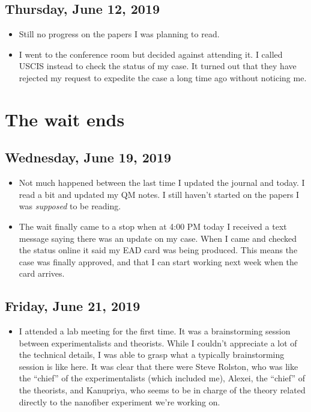 \documentclass{report}
\theoremstyle{definition}
\begin{document}
\section{Thursday, June 12, 2019}
\begin{itemize}
	\item Still no progress on the papers I was planning to read.
	
	\item I went to the conference room but decided against attending it. I called USCIS instead to check the status of my case. It turned out that they have rejected my request to expedite the case a long time ago without noticing me.
\end{itemize}

\chapter{The wait ends}
\section{Wednesday, June 19, 2019}
\begin{itemize}
	\item Not much happened between the last time I updated the journal and today. I read a bit and updated my QM notes. I still haven't started on the papers I was \textit{supposed} to be reading.
	
	\item The wait finally came to a stop when at 4:00 PM today I received a text message saying there was an update on my case. When I came and checked the status online it said my EAD card was being produced. This means the case was finally approved, and that I can start working next week when the card arrives.
	
\end{itemize}

\section{Friday, June 21, 2019}
\begin{itemize}
	\item I attended a lab meeting for the first time. It was a brainstorming session between experimentalists and theorists. While I couldn't appreciate a lot of the technical details, I was able to grasp what a typically brainstorming session is like here. It was clear that there were Steve Rolston, who was like the ``chief'' of the experimentalists (which included me), Alexei, the ``chief'' of the theorists, and Kanupriya, who seems to be in charge of the theory related directly to the nanofiber experiment we're working on. 
\end{itemize}
\end{document}
